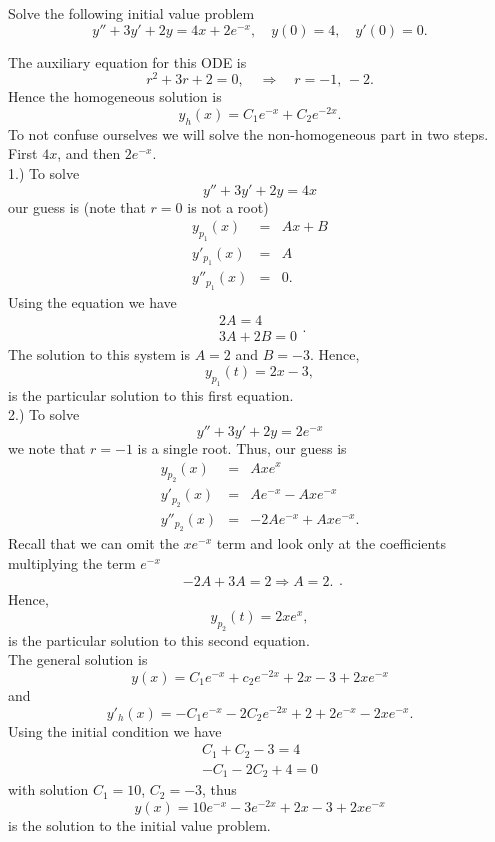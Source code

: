 \documentclass[11pt]{article}
\begin{document}
\begin{problem}
Solve the following initial value problem
\begin{equation*}
     y''+3y'+2y=4x+2e^{-x}, \quad y(0)=4, \quad y'(0)=0.
\end{equation*}
\end{problem}
\begin{solution}
The auxiliary equation for this ODE is 
\begin{equation}
r^2 +3r +2 =0, \quad  \Rightarrow \quad r= -1 , \, -2.
\end{equation}
Hence the homogeneous solution is
\begin{equation}
y_{h}(x) = C_{1} e^{- x} + C_{2} e^{-2x}.
\end{equation}
To not confuse ourselves we will solve the non-homogeneous part in two steps. First $4x$, and then $2e^{-x}$.\\
1.) To solve 
\[ y''+3y'+2y=4x\]
our guess is (note that $r=0$ is not a root)
\begin{eqnarray*}
y_{p_{1}}(x) & = & Ax +B \\
y'_{p_{1}}(x) & = & A \\
y''_{p_{1}}(x) & = & 0.
\end{eqnarray*}
Using the equation we have
\begin{equation*} \begin{split}
 2A = 4 \\
 3A + 2B = 0
\end{split}.
\end{equation*}
The solution to this system is $A = 2$ and $B=-3$. Hence, 
$$y_{p_{1}}(t) = 2x -3,$$ 
is the particular solution to this first equation.\\
2.) To solve 
\[ y''+3y'+2y=2e^{-x}\]
we note that $r=-1$ is a single root. Thus, our guess is 
\begin{eqnarray*}
y_{p_{2}}(x) & = & Axe^{x} \\
y'_{p_{2}}(x) & = & Ae^{-x} - Axe^{-x} \\
y''_{p_{2}}(x) & = & -2Ae^{-x} + Axe^{-x}.
\end{eqnarray*}
Recall that we can omit the $xe^{-x}$ term and look only at the coefficients multiplying the term $e^{-x}$ 
\begin{equation*} \begin{split}
 -2A + 3A = 2 \Rightarrow A = 2.
\end{split}.
\end{equation*}
Hence, 
$$y_{p_{2}}(t) = 2xe^{x},$$ 
is the particular solution to this second equation.\\
The general solution is 
\[{y(x)=C_{1} e^{- x} + c_{2} e^{-2x} +2x -3 +2xe^{-x}}\]
and 
\[y'_{h}(x)=-C_{1} e^{- x} -2 C_{2} e^{-2x} + 2 + 2 e^{-x} -2xe^{-x}.\]
Using the initial condition we have
\begin{equation*}
\begin{split}
C_{1}+C_{2} -3=4\\
-C_{1}-2C_{2}+4=0
\end{split}
\end{equation*}
with solution $C_{1}=10$, $C_{2}=-3$, thus
\[\boxed{y(x)=10 e^{- x} -3 e^{-2x} +2x -3 +2xe^{-x}}\]
is the solution to the initial value problem.
\end{solution}
\end{document}
